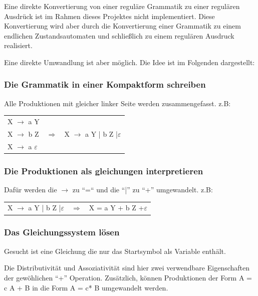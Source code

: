 Eine direkte Konvertierung von einer reguläre Grammatik zu einer regulären
Ausdrück ist im Rahmen dieses Projektes nicht implementiert. Diese Konvertierung
wird aber durch die Konvertierung einer Grammatik zu einem endlichen
Zustandsautomaten und schließlich zu einem regulären Ausdruck realisiert.

Eine direkte Umwandlung ist aber möglich. Die Idee ist im Folgenden dargestellt:
\subsubsection*{Die Grammatik in einer Kompaktform schreiben}
Alle Produktionen mit gleicher linker Seite werden zusammengefasst. z.B:

\begin{tabular}{lcr}

X $\rightarrow$ a Y & & \\
X $\rightarrow$ b Z & $\Longrightarrow$ & X $\rightarrow$ a Y | b Z
|$\varepsilon$\\
X $\rightarrow$ a $\varepsilon$ & &\\
 
\end{tabular}

\subsubsection*{Die Produktionen als gleichungen interpretieren}

Dafür werden die $\rightarrow$ zu ``=``  und die ``|'' zu ``+'' umgewandelt.
z.B:

\begin{tabular}{lcr}

X $\rightarrow$ a Y | b Z |$\varepsilon$ & $\Longrightarrow$ & X = a Y + b Z
+$\varepsilon$\\

 
\end{tabular}

\subsubsection*{Das Gleichungssystem lösen}

Gesucht ist eine Gleichung die nur das Startsymbol als Variable enthält.

Die Distributivität und Assoziativität sind hier zwei verwendbare Eigenschaften der
gewöhlichen ``+'' Operation. Zusätzlich, können Produktionen der Form A = c A +
B in die Form A = c* B umgewandelt werden.
